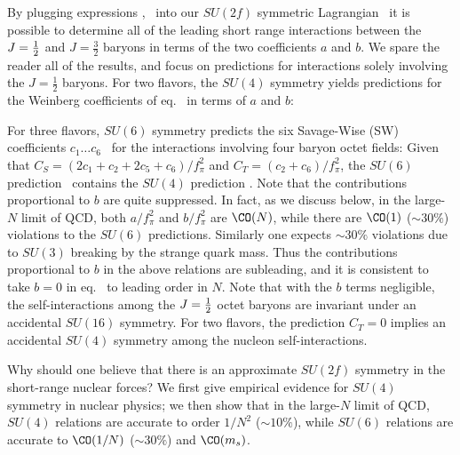  By plugging expressions \decompii, \decompiii\ into our $SU(2f)$ symmetric
Lagrangian \suivop\ it is possible to determine all of the leading short range
interactions between the $J={\textstyle{1\over2}}$ and $J=\frac{3}{2}$ baryons in terms of the
two coefficients $a$ and $b$.  We spare the reader all of the results, and
focus on predictions for interactions solely involving the $J=\frac{1}{2}$
baryons. For two flavors,  the $SU(4)$ symmetry yields predictions for the
Weinberg coefficients of eq. \csct\ in terms of $a$ and $b$:
\eqn{}

For three flavors, $SU(6)$ symmetry predicts the six Savage-Wise (SW)
coefficients $c_1\ldots c_6$ \sav\ for the interactions involving four baryon
octet fields:
\eqn{}
 Given that $C_S=(2c_1+c_2+2c_5+c_6)/f_\pi^2$ and
$C_T=(c_2+c_6)/f_\pi^2$, the
$SU(6)$ prediction \resiii\ contains the $SU(4)$ prediction \resii.
Note that the contributions proportional to $b$ are quite suppressed.
In fact, as we discuss below, in the large-$N$ limit of QCD,
both $a/f_\pi^2$ and $b/f_\pi^2$ are $\CO(N)$, while there are
$\CO(1)$ ($\sim 30\% $) violations to the $SU(6)$ predictions.
Similarly one expects $\sim 30\% $ violations due to $SU(3)$ breaking by
the strange quark mass.
Thus the contributions proportional to $b$ in the above
relations are subleading, and it is consistent to take $b=0$ in eq. \resiii\
to leading order in $N$. Note that with the $b$ terms negligible,
the self-interactions  among the  $J={\textstyle{1\over2}}$ octet baryons
are invariant under an accidental $SU(16)$ symmetry.  For two flavors, the
prediction $C_T=0$ implies an accidental $SU(4)$ symmetry among the nucleon
self-interactions.


Why should one believe that there is an approximate $SU(2f)$ symmetry in the
short-range nuclear forces?  We first give empirical evidence for $SU(4)$
symmetry in nuclear physics; we then show that in the large-$N$ limit of QCD,
$SU(4)$ relations are accurate to order $1/N^2$ ($\sim 10\%$), while $SU(6)$
relations are accurate to $\CO(1/N)$ ($\sim 30\%$) and $\CO(m_s)$.


